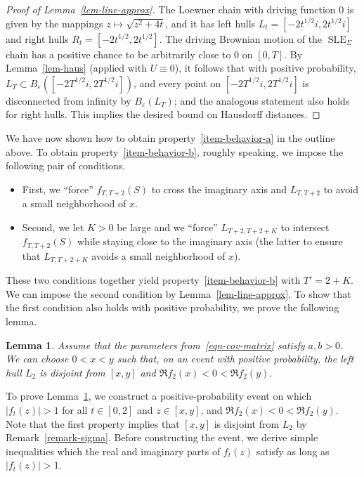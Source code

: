 \documentclass[11pt]{article}
\theoremstyle{plain}
\newtheorem{lem}[thm]{Lemma}
\theoremstyle{definition}
\numberwithin{equation}{section}
\newcommand{\ep}{\varepsilon}
\newcommand{\SLEG}{{\operatorname{SLE}}_\Sigma}
\begin{document}
\begin{proof}[Proof of Lemma~\ref{lem-line-approx}]
The Loewner chain with driving function $0$ is given by the mappings $z \mapsto \sqrt{z^2 + 4t}$, and it has left hulls $L_t = [-2t^{1/2} i , 2 t^{1/2} i]$ and right hulls $R_t = [-2t^{1/2}, 2 t^{1/2}]$.  The driving Brownian motion of the $\SLEG$ chain has a positive chance to be arbitrarily close to $0$ on $[0,T]$.
By Lemma~\ref{lem-haus} (applied with $U \equiv 0$), it follows that with positive probability, $L_T \subset B_\ep(   [-2T^{1/2} i , 2 T^{1/2} i]  )$, and every point on $[-2T^{1/2} i , 2 T^{1/2} i]$ is disconnected from infinity by $B_\ep(L_T)$; and the analogous statement also holds for right hulls. This implies the desired bound on Hausdorff distances.
\end{proof}

We have now shown how to obtain property~\ref{item-behavior-a} in the outline above.  To obtain property~\ref{item-behavior-b}, roughly speaking, we impose the following pair of conditions.
\begin{itemize}
\item
First, we ``force'' $f_{T,T+2}(S)$ to cross the imaginary axis and $L_{T,T+2}$ to avoid a small neighborhood of $x$.
\item
Second, we let $K>0$ be large and we ``force'' $L_{T+2,T+2+K}$ to intersect $f_{T,T+2}(S)$ while staying close to the imaginary axis (the latter to ensure that $L_{T,T+2+K}$ avoids a small neighborhood of $x$).
\end{itemize}
These two conditions together yield property~\ref{item-behavior-b} with $T' = 2+K$.  We can impose the second condition by Lemma~\ref{lem-line-approx}.  To show that the first condition also holds with positive probability, we prove the following lemma.

\begin{lem}
\label{lem-pos-hits-before-neg} Assume that the parameters from~\eqref{eqn-cov-matrix} satisfy $a,b>0$. 
We can choose $0<x<y$ such that, on an event with positive probability, the left hull $L_2$ is disjoint from $[x,y]$ and $\Re f_2(x) < 0 < \Re f_2(y)$.
\end{lem}

To prove Lemma~\ref{lem-pos-hits-before-neg}, we construct a positive-probability event on which $|f_t(z)| > 1$ for all $t \in [0,2]$ and $z \in [x,y]$, and $\Re f_2(x) < 0 < \Re f_2(y)$.  Note that the first property implies that $[x,y]$ is disjoint from $L_2$ by Remark~\ref{remark-sigma}.  Before constructing the event, we derive simple inequalities which the real and imaginary parts of $f_t(z)$ satisfy as long as $|f_t(z)| > 1$.
\end{document}
